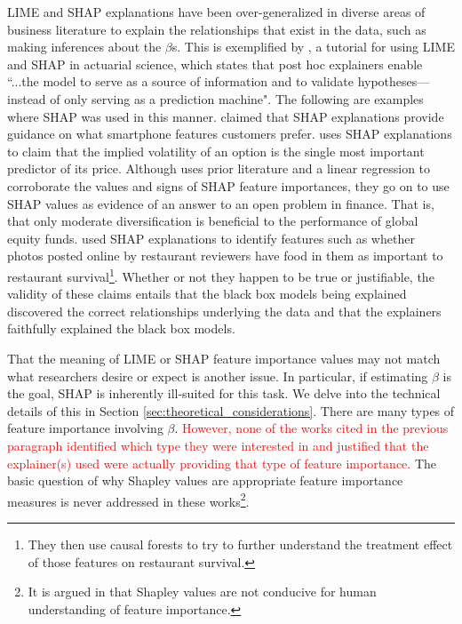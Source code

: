 \documentclass[mnsc,blindrev]{informs3}
\begin{document}
LIME and SHAP explanations have been over-generalized in diverse areas of business literature to explain the relationships that exist in the data, such as making inferences about the $\beta$s. This is exemplified by \citet{lorentzen2020peeking}, a tutorial for using LIME and SHAP in actuarial science, which states that post hoc explainers enable ``...the model to serve as a source of information and to validate hypotheses—instead of only serving as a prediction machine". The following are examples where SHAP was used in this manner. \citet{park2024extracting} claimed that SHAP explanations provide guidance on what smartphone features customers prefer. \citet{bali2023option} uses SHAP explanations to claim that the implied volatility of an option is the single most important predictor of its price. Although \citet{kovvuri23fund} uses prior literature and a linear regression to corroborate the values and signs of SHAP feature importances, they go on to use SHAP values as evidence of an answer to an open problem in finance. That is, that only moderate diversification is beneficial to the performance of global equity funds. \citet{zhang2023can} used SHAP explanations to identify features such as whether photos posted online by restaurant reviewers have food in them as important to restaurant survival\footnote{They then use causal forests to try to further understand the treatment effect of those features on restaurant survival.}. Whether or not they happen to be true or justifiable, the validity of these claims entails that the black box models being explained discovered the correct relationships underlying the data and that the explainers faithfully explained the black box models. 

That the meaning of LIME or SHAP feature importance values may not match what researchers desire or expect is another issue. In particular, if estimating $\beta$ is the goal, SHAP is inherently ill-suited for this task. We delve into the technical details of this in Section \ref{sec:theoretical_considerations}. There are many types of feature importance \citep{AchenChristopherH1982Iaur} involving $\beta$. \textcolor{red}{However, none of the works cited in the previous paragraph identified which type they were interested in and justified that the explainer(s) used were actually providing that type of feature importance.} The basic question of why Shapley values are appropriate feature importance measures is never addressed in these works\footnote{It is argued in \citep{kumar20shap} that Shapley values are not conducive for human understanding of feature importance.}. 
\end{document}
